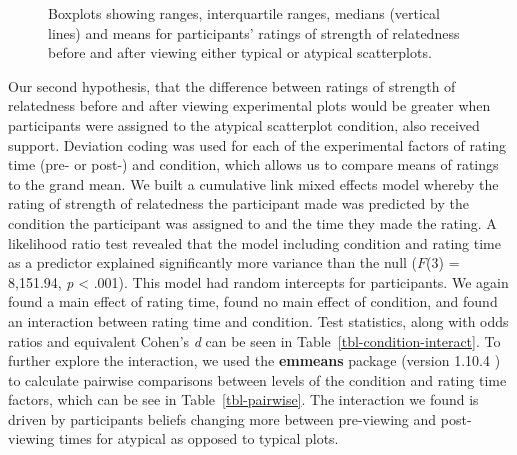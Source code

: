 \documentclass[manuscript,screen,review,anonymous]{acmart}
\begin{document}
\begin{figure}


\caption{\label{fig-descriptives}Boxplots showing ranges, interquartile
ranges, medians (vertical lines) and means for participants' ratings of
strength of relatedness before and after viewing either typical or
atypical scatterplots.}

\end{figure}%

Our second hypothesis, that the difference between ratings of strength
of relatedness before and after viewing experimental plots would be
greater when participants were assigned to the atypical scatterplot
condition, also received support. Deviation coding was used for each of
the experimental factors of rating time (pre- or post-) and condition,
which allows us to compare means of ratings to the grand mean. We built
a cumulative link mixed effects model whereby the rating of strength of
relatedness the participant made was predicted by the condition the
participant was assigned to and the time they made the rating. A
likelihood ratio test revealed that the model including condition and
rating time as a predictor explained significantly more variance than
the null (\(F\)(3) = 8,151.94, \emph{p} \textless{} .001). This model
had random intercepts for participants. We again found a main effect of
rating time, found no main effect of condition, and found an interaction
between rating time and condition. Test statistics, along with odds
ratios and equivalent Cohen's \emph{d} can be seen in
Table~\ref{tbl-condition-interact}. To further explore the interaction,
we used the \textbf{emmeans} package (version 1.10.4 \citep{emmeans}) to
calculate pairwise comparisons between levels of the condition and
rating time factors, which can be see in Table~\ref{tbl-pairwise}. The
interaction we found is driven by participants beliefs changing more
between pre-viewing and post-viewing times for atypical as opposed to
typical plots.
\end{document}
